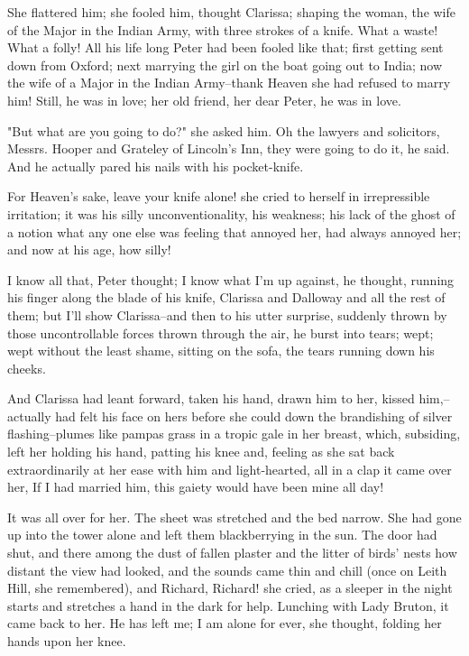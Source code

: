 \documentclass[lang=cn,10pt]{elegantbook}
\begin{document}
She flattered him; she fooled him, thought Clarissa; shaping the
woman, the wife of the Major in the Indian Army, with three strokes
of a knife.  What a waste!  What a folly!  All his life long Peter
had been fooled like that; first getting sent down from Oxford;
next marrying the girl on the boat going out to India; now the wife
of a Major in the Indian Army--thank Heaven she had refused to
marry him!  Still, he was in love; her old friend, her dear Peter,
he was in love.

"But what are you going to do?" she asked him.  Oh the lawyers and
solicitors, Messrs. Hooper and Grateley of Lincoln's Inn, they were
going to do it, he said.  And he actually pared his nails with his
pocket-knife.

For Heaven's sake, leave your knife alone! she cried to herself in
irrepressible irritation; it was his silly unconventionality, his
weakness; his lack of the ghost of a notion what any one else was
feeling that annoyed her, had always annoyed her; and now at his
age, how silly!

I know all that, Peter thought; I know what I'm up against, he
thought, running his finger along the blade of his knife, Clarissa
and Dalloway and all the rest of them; but I'll show Clarissa--and
then to his utter surprise, suddenly thrown by those uncontrollable
forces thrown through the air, he burst into tears; wept; wept
without the least shame, sitting on the sofa, the tears running
down his cheeks.

And Clarissa had leant forward, taken his hand, drawn him to her,
kissed him,--actually had felt his face on hers before she could
down the brandishing of silver flashing--plumes like pampas grass
in a tropic gale in her breast, which, subsiding, left her
holding his hand, patting his knee and, feeling as she sat back
extraordinarily at her ease with him and light-hearted, all in a
clap it came over her, If I had married him, this gaiety would have
been mine all day!

It was all over for her.  The sheet was stretched and the bed
narrow.  She had gone up into the tower alone and left them
blackberrying in the sun.  The door had shut, and there among the
dust of fallen plaster and the litter of birds' nests how distant
the view had looked, and the sounds came thin and chill (once on
Leith Hill, she remembered), and Richard, Richard! she cried, as a
sleeper in the night starts and stretches a hand in the dark for
help.  Lunching with Lady Bruton, it came back to her.  He has left
me; I am alone for ever, she thought, folding her hands upon her
knee.
\end{document}
